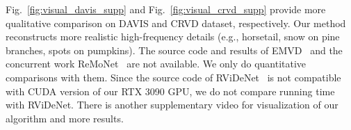 \documentclass[sigconf]{acmart}
\begin{document}
\begin{table*}[h]
\centering
\caption{Quantitative ablation study of shifted ratio .  is the best setting among }
\renewcommand{\arraystretch}{1.0}
\label{table:ablation_ratio}
\end{table*}


Fig.~\ref{fig:visual_davis_supp} and Fig.~\ref{fig:visual_crvd_supp} provide more qualitative comparison on DAVIS and CRVD dataset, respectively. Our method reconstructs more realistic high-frequency details (e.g., horsetail, snow on pine branches, spots on pumpkins). The source code and results of EMVD~\cite{Maggioni2021Efficient} and the concurrent work ReMoNet~\cite{Xiang2022ReMoNet} are not available. We only do quantitative comparisons with them. Since the source code of RViDeNet~\cite{yue2020supervised} is not compatible with CUDA version of our RTX 3090 GPU, we do not compare running time with RViDeNet.
There is another supplementary video for visualization of our algorithm and more results.
\end{document}
